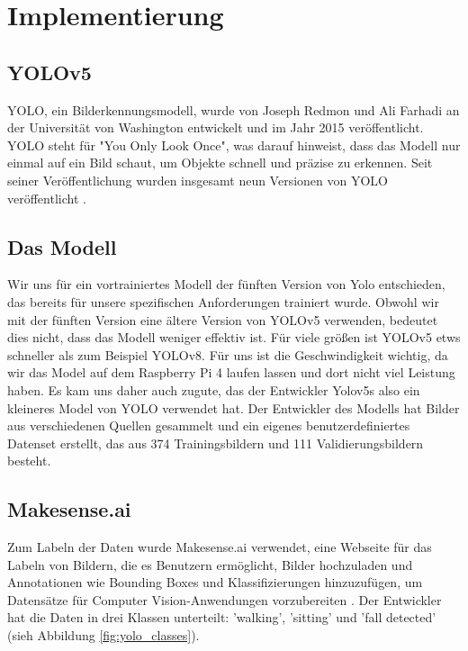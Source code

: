 \section{Implementierung}

\subsection{YOLOv5}
YOLO, ein Bilderkennungsmodell, wurde von Joseph Redmon und Ali Farhadi an der Universität von Washington entwickelt und im Jahr 2015 veröffentlicht. YOLO steht für "You Only Look Once", was darauf hinweist, dass das Modell nur einmal auf ein Bild schaut, um Objekte schnell und präzise zu erkennen. Seit seiner Veröffentlichung wurden insgesamt neun Versionen von YOLO veröffentlicht \cite{Yolo}.
\subsection{Das Modell}
Wir uns für ein vortrainiertes Modell der fünften Version von Yolo entschieden, das bereits für unsere spezifischen Anforderungen trainiert wurde. Obwohl wir mit der fünften Version eine ältere Version von YOLOv5 verwenden, bedeutet dies nicht, dass das Modell weniger effektiv ist. Für viele größen ist YOLOv5 etws schneller als zum Beispiel YOLOv8. Für uns ist die Geschwindigkeit wichtig, da wir das Model auf dem Raspberry Pi 4 laufen lassen und dort nicht viel Leistung haben.  Es kam uns daher auch zugute, das der Entwickler Yolov5s also ein kleineres Model von YOLO verwendet hat.   Der Entwickler des Modells hat Bilder aus verschiedenen Quellen gesammelt und ein eigenes benutzerdefiniertes Datenset erstellt, das aus 374 Trainingsbildern und 111 Validierungsbildern besteht.


\subsection{Makesense.ai}
Zum Labeln der Daten wurde Makesense.ai verwendet, eine Webseite für das Labeln von Bildern, die es Benutzern ermöglicht, Bilder hochzuladen und Annotationen wie Bounding Boxes und Klassifizierungen hinzuzufügen, um Datensätze für Computer Vision-Anwendungen vorzubereiten \cite{noauthor_make_nodate}. Der Entwickler hat die Daten in drei Klassen unterteilt: 'walking', 'sitting' und 'fall detected' (sieh Abbildung \ref{fig:yolo_classes}).


